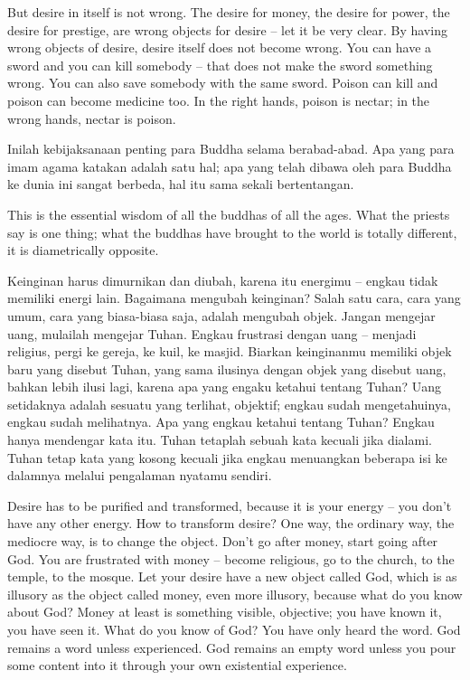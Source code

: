 \english
But desire in itself is not wrong. The desire for money, the desire for power, the desire for prestige, are wrong objects for desire -- let it be very clear. By having wrong objects of desire, desire itself does not become wrong. You can have a sword and you can kill somebody -- that does not make the sword something wrong. You can also save somebody with the same sword. Poison can kill and poison can become medicine too. In the right hands, poison is nectar; in the wrong hands, nectar is poison.

\bahasa
Inilah kebijaksanaan penting para Buddha selama berabad-abad. Apa yang para imam agama katakan adalah satu hal; apa yang telah dibawa oleh para Buddha ke dunia ini sangat berbeda, hal itu sama sekali bertentangan.

\english
This is the essential wisdom of all the buddhas of all the ages. What the priests say is one thing; what the buddhas have brought to the world is totally different, it is diametrically opposite.

\bahasa
Keinginan harus dimurnikan dan diubah, karena itu energimu -- engkau tidak memiliki energi lain. Bagaimana mengubah keinginan? Salah satu cara, cara yang umum, cara yang biasa-biasa saja, adalah mengubah objek. Jangan mengejar uang, mulailah mengejar Tuhan. Engkau frustrasi dengan uang -- menjadi religius, pergi ke gereja, ke kuil, ke masjid. Biarkan keinginanmu memiliki objek baru yang disebut Tuhan, yang sama ilusinya dengan objek yang disebut uang, bahkan lebih ilusi lagi, karena apa yang engaku ketahui tentang Tuhan? Uang setidaknya adalah sesuatu yang terlihat, objektif; engkau sudah mengetahuinya, engkau sudah melihatnya. Apa yang engkau ketahui tentang Tuhan? Engkau hanya mendengar kata itu. Tuhan tetaplah sebuah kata kecuali jika dialami. Tuhan tetap kata yang kosong kecuali jika engkau menuangkan beberapa isi ke dalamnya melalui pengalaman nyatamu sendiri.

\english
Desire has to be purified and transformed, because it is your energy -- you don't have any other energy. How to transform desire? One way, the ordinary way, the mediocre way, is to change the object. Don't go after money, start going after God. You are frustrated with money -- become religious, go to the church, to the temple, to the mosque. Let your desire have a new object called God, which is as illusory as the object called money, even more illusory, because what do you know about God? Money at least is something visible, objective; you have known it, you have seen it. What do you know of God? You have only heard the word. God remains a word unless experienced. God remains an empty word unless you pour some content into it through your own existential experience.

